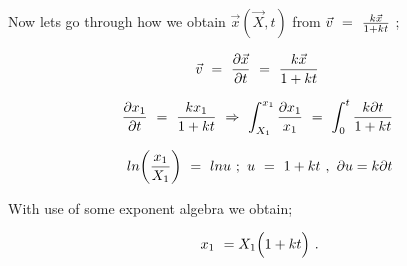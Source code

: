 \documentclass{article}
\begin{document}
Now lets go through how we obtain \begin{math} \vec{x}( \vec{X} , t ) \end{math} from \begin{math} \vec{v} \hspace{0.125cm} = \hspace{0.125cm} \frac{k \vec{x}}{1 + kt} \end{math} ; 

\begin{equation} \label{eb-eq-1-26}
\vec{v} \hspace{0.125cm} = \hspace{0.125cm} \frac{\partial{\vec{x}}}{\partial{t}} \hspace{0.125cm} = \hspace{0.125cm} \frac{k \vec{x}}{1 + kt} \hspace{0.125cm}
\end{equation}

\begin{equation} \label{eb-eq-1-27}
\frac{\partial{x_1}}{\partial{t}} \hspace{0.125cm} = \hspace{0.125cm} \frac{k x_1}{1 + kt} \hspace{0.125cm} \Rightarrow \hspace{0.125cm} \int_{X_1}^{x_1} \frac{\partial{x_1}}{x_1} \hspace{0.125cm} = \hspace{0.125cm} \int_{0}^{t} \frac{k \partial{t}}{1 + kt} \hspace{0.125cm}
\end{equation}

\begin{equation} \label{eb-eq-1-28}
ln \bigg(\frac{x_1}{X_1}\bigg) \hspace{0.125cm} =  \hspace{0.125cm} ln u   \hspace{0.125cm} ; \hspace{0.125cm} u \hspace{0.125cm} = \hspace{0.125cm} 1 + kt  \hspace{0.125cm} , \hspace{0.125cm} \partial{u} = k \partial{t}
\end{equation}

With use of some exponent algebra we obtain;

\begin{equation} \label{eb-eq-1-29}
x_1 \hspace{0.125cm} = X_1 \Big( 1 + k t \Big)  \hspace{0.125cm} .
\end{equation}
\end{document}
